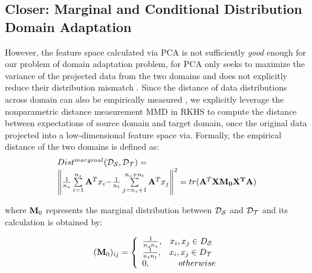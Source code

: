 \documentclass[10pt,twocolumn,letterpaper]{article}
\begin{document}
\begin{CJK*}{UTF8}{gkai}
\subsection{ Closer: Marginal and Conditional Distribution Domain Adaptation}
However, the feature space calculated via PCA is not sufficiently \emph{good} enough for our problem of domain adaptation problem, for PCA only seeks to maximize the variance of the projected data from the two domains and does not explicitly reduce their distribution mismatch \cite{long2013transfer,long2015learning}.     Since the distance of data distributions across domain  can also be empirically measured , we explicitly leverage the nonparametric distance measurement MMD in RKHS \cite{borgwardt2006integrating} to compute the distance between expectations of source domain and target domain, once the original data projected into  a low-dimensional feature space via.  Formally, the empirical distance of the two domains  is defined as:
\begin{equation}\label{eq:marginal}
	\begin{array}{l}		
		Dis{t^{marginal}}({{\cal D}_{\cal S}},{{\cal D}_{\cal T}}) =\\ {\left\| {\frac{1}{{{n_s}}}\sum\limits_{i = 1}^{{n_s}} {{{\bf{A}}^T}{x_i} - } \frac{1}{{{n_t}}}\sum\limits_{j = {n_s} + 1}^{{n_s} + {n_t}} {{{\bf{A}}^T}{x_j}} } \right\|^2}
		= tr({{\bf{A}}^T}\bf{X}{\bf{M_0}}\bf{{X^T}A})		
		\end{array}
\end{equation}

where ${{\bf{M}}_0}$ represents the marginal distribution between ${{\cal D}_{\cal S}}$ and ${{\cal D}_{\cal T}}$ and its calculation is obtained by:
	
	\begin{equation}\label{eq:M0}
	\begin{array}{l}
	{({{\bf{M}}_0})_{ij}} = \left\{ \begin{array}{l}
	\frac{1}{{{n_s}{n_s}}},\;\;\;{x_i},{x_j} \in {D_{\cal S}}\\
	\frac{1}{{{n_t}{n_t}}},\;\;\;{x_i},{x_j} \in {D_{\cal T}}\\
	0,\;\;\;\;\;\;\;\;\;\;\;\;otherwise
	\end{array} \right.
	\end{array}
	\end{equation}
    


\end{CJK*}
\end{document}
